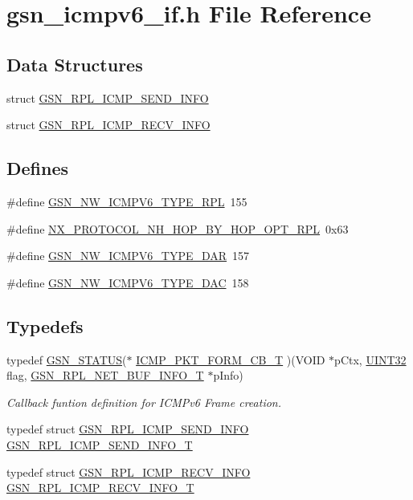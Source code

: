 \hypertarget{a00517}{
\section{gsn\_\-icmpv6\_\-if.h File Reference}
\label{a00517}
}
\subsection*{Data Structures}
\begin{DoxyCompactItemize}
\item 
struct \hyperlink{a00202}{GSN\_\-RPL\_\-ICMP\_\-SEND\_\-INFO}
\item 
struct \hyperlink{a00201}{GSN\_\-RPL\_\-ICMP\_\-RECV\_\-INFO}
\end{DoxyCompactItemize}
\subsection*{Defines}
\begin{DoxyCompactItemize}
\item 
\#define \hyperlink{a00517_a2642b7d250423c7b7524057d29b54511}{GSN\_\-NW\_\-ICMPV6\_\-TYPE\_\-RPL}~155
\item 
\#define \hyperlink{a00517_a6dc1fad08aee881cc17ed9712e82667e}{NX\_\-PROTOCOL\_\-NH\_\-HOP\_\-BY\_\-HOP\_\-OPT\_\-RPL}~0x63
\item 
\#define \hyperlink{a00517_a940c791f30b90f1694c39ef73afed3c6}{GSN\_\-NW\_\-ICMPV6\_\-TYPE\_\-DAR}~157
\item 
\#define \hyperlink{a00517_a6fe0f507c619484e4329d0ca0874c676}{GSN\_\-NW\_\-ICMPV6\_\-TYPE\_\-DAC}~158
\end{DoxyCompactItemize}
\subsection*{Typedefs}
\begin{DoxyCompactItemize}
\item 
typedef \hyperlink{a00660_gada5951904ac6110b1fa95e51a9ddc217}{GSN\_\-STATUS}($\ast$ \hyperlink{a00517_a78118dbc6ab28e82664a90f2ab3fcc38}{ICMP\_\-PKT\_\-FORM\_\-CB\_\-T} )(VOID $\ast$pCtx, \hyperlink{a00660_gae1e6edbbc26d6fbc71a90190d0266018}{UINT32} flag, \hyperlink{a00207}{GSN\_\-RPL\_\-NET\_\-BUF\_\-INFO\_\-T} $\ast$pInfo)
\begin{DoxyCompactList}\small\item\em Callback funtion definition for ICMPv6 Frame creation. \end{DoxyCompactList}\item 
typedef struct \hyperlink{a00202}{GSN\_\-RPL\_\-ICMP\_\-SEND\_\-INFO} \hyperlink{a00517_a58a5688ef70025c73273fd000f498f71}{GSN\_\-RPL\_\-ICMP\_\-SEND\_\-INFO\_\-T}
\item 
typedef struct \hyperlink{a00201}{GSN\_\-RPL\_\-ICMP\_\-RECV\_\-INFO} \hyperlink{a00517_aa9e1485ab17057b7e24a40c17643f5c9}{GSN\_\-RPL\_\-ICMP\_\-RECV\_\-INFO\_\-T}
\end{DoxyCompactItemize}
